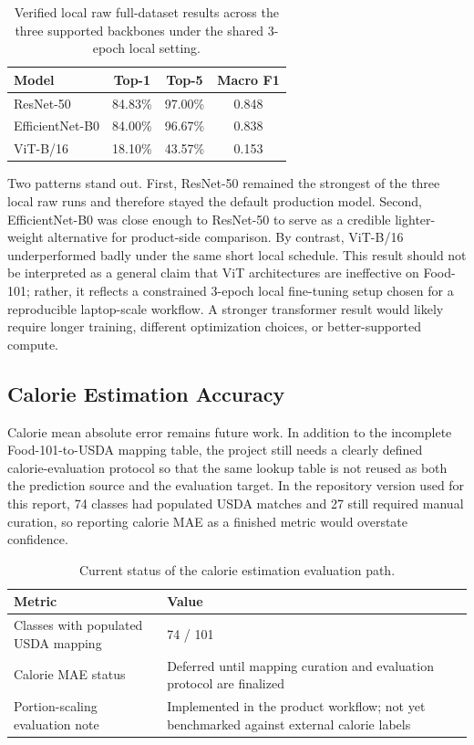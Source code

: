 \documentclass[sigconf,nonacm,11pt]{acmart}
\begin{document}
\begin{table}
  \caption{Verified local raw full-dataset results across the three supported backbones under the shared 3-epoch local setting.}
  \label{tab:cross-arch-results}
  \begin{tabular}{lccc}
    \toprule
    Model & Top-1 & Top-5 & Macro F1 \\
    \midrule
    ResNet-50 & 84.83\% & 97.00\% & 0.848 \\
    EfficientNet-B0 & 84.00\% & 96.67\% & 0.838 \\
    ViT-B/16 & 18.10\% & 43.57\% & 0.153 \\
    \bottomrule
  \end{tabular}
\end{table}

Two patterns stand out. First, ResNet-50 remained the strongest of the three local raw runs and therefore stayed the default production model. Second, EfficientNet-B0 was close enough to ResNet-50 to serve as a credible lighter-weight alternative for product-side comparison. By contrast, ViT-B/16 underperformed badly under the same short local schedule. This result should not be interpreted as a general claim that ViT architectures are ineffective on Food-101; rather, it reflects a constrained 3-epoch local fine-tuning setup chosen for a reproducible laptop-scale workflow. A stronger transformer result would likely require longer training, different optimization choices, or better-supported compute.

\subsection{Calorie Estimation Accuracy}
Calorie mean absolute error remains future work. In addition to the incomplete Food-101-to-USDA mapping table, the project still needs a clearly defined calorie-evaluation protocol so that the same lookup table is not reused as both the prediction source and the evaluation target. In the repository version used for this report, 74 classes had populated USDA matches and 27 still required manual curation, so reporting calorie MAE as a finished metric would overstate confidence.

\begin{table}
  \caption{Current status of the calorie estimation evaluation path.}
  \label{tab:calorie-results}
  \footnotesize
  \setlength{\tabcolsep}{3pt}
  \begin{tabularx}{\columnwidth}{@{}>{\raggedright\arraybackslash}p{}X@{}}
    \toprule
    Metric & Value \\
    \midrule
    Classes with populated USDA mapping & 74 / 101 \\
    Calorie MAE status & Deferred until mapping curation and evaluation protocol are finalized \\
    Portion-scaling evaluation note & Implemented in the product workflow; not yet benchmarked against external calorie labels \\
    \bottomrule
  \end{tabularx}
\end{table}
\end{document}

